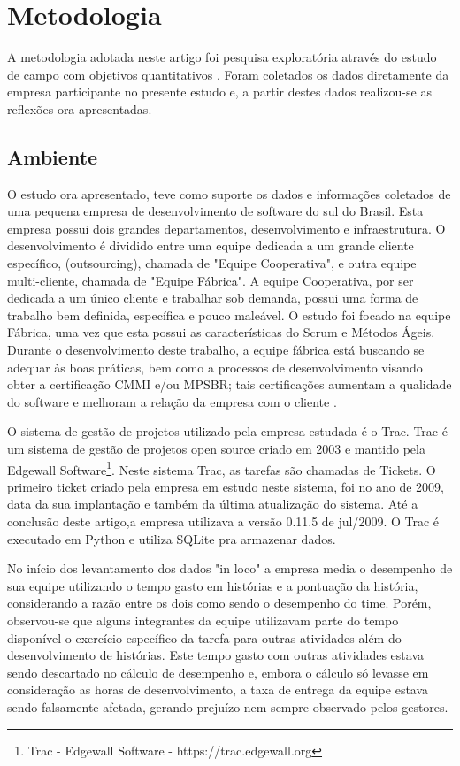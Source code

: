 \section{Metodologia}
A metodologia adotada neste artigo foi pesquisa exploratória através do estudo de campo com objetivos quantitativos \cite{metodopesquisa}. Foram coletados os dados diretamente da empresa participante no presente estudo e, a partir destes dados realizou-se as reflexões ora apresentadas.\par

\subsection{Ambiente}
O estudo ora apresentado, teve como suporte os dados e informações coletados de uma pequena empresa de desenvolvimento de software do sul do Brasil. Esta empresa possui dois grandes departamentos, desenvolvimento e infraestrutura. O desenvolvimento é dividido entre uma equipe dedicada a um grande cliente específico,  (outsourcing), chamada de "Equipe Cooperativa", e outra equipe multi-cliente, chamada de "Equipe Fábrica". A equipe Cooperativa, por ser dedicada a um único cliente e trabalhar sob demanda, possui uma forma de trabalho bem definida, específica e pouco maleável. O estudo foi focado na equipe Fábrica, uma vez que esta possui as características do Scrum e Métodos Ágeis. Durante o desenvolvimento deste trabalho, a equipe fábrica está buscando se adequar às boas práticas, bem como a processos de desenvolvimento visando obter a certificação CMMI e/ou MPSBR; tais certificações aumentam a qualidade do software e melhoram a relação da empresa com o cliente \cite{MPSBRCMMI}.\par

O sistema de gestão de projetos utilizado pela empresa estudada é o Trac. Trac é um sistema de gestão de projetos open source criado em 2003 e mantido pela Edgewall Software\footnote[1]{ Trac - Edgewall Software - https://trac.edgewall.org }. Neste sistema Trac, as tarefas são chamadas de Tickets. O primeiro ticket criado pela empresa em estudo neste sistema, foi no ano de 2009, data da sua implantação e também da última atualização do sistema. Até a conclusão deste artigo,a empresa utilizava a versão 0.11.5 de jul/2009. O Trac é executado em Python e utiliza SQLite pra armazenar dados.\par

No início dos levantamento dos dados "in loco" a empresa media o desempenho de sua equipe utilizando o tempo gasto em histórias e a pontuação da história, considerando a razão entre os dois como sendo o desempenho do time. Porém, observou-se que alguns integrantes da equipe utilizavam parte do tempo disponível o exercício específico da tarefa para outras atividades além do desenvolvimento de histórias. Este tempo gasto com outras atividades estava sendo descartado no cálculo de desempenho e, embora o cálculo só levasse em consideração as horas de desenvolvimento, a taxa de entrega da equipe estava sendo falsamente afetada, gerando prejuízo nem sempre observado pelos gestores.\par

